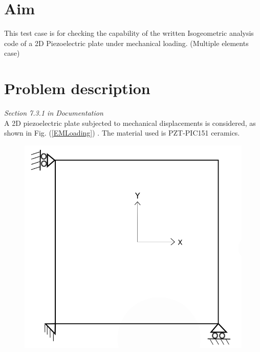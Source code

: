 \documentclass[12pt]{article}
\begin{document}
\section{Aim}
This test case is for checking the capability of the written Isogeometric analysis code of a 2D Piezoelectric plate under mechanical loading. (Multiple elements case)
\section{Problem description} \label{2DPPWMLPD}
\emph{Section 7.3.1 in Documentation}\\
A 2D piezoelectric plate subjected to mechanical displacements is considered, as shown in Fig. (\ref{EMLoading}) . The material used is PZT-PIC151 ceramics.

\begin{figure}[H]
	\centering
	\begin{minipage}{.5\textwidth}
		\centering
		\includegraphics[width=0.8\linewidth]{2DPlate.png}
		\label{2Dplate}
	\end{minipage}%
	\begin{minipage}{.5\textwidth}
		\centering

\end{minipage}
\end{figure}
\end{document}
